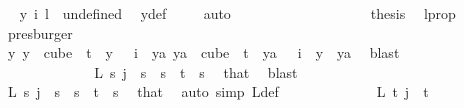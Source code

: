 \begin{isabellebody}
\ \isamarkupfalse%
\ {\isachardoublequoteopen}y\ i\ l\ {\isacharequal}{\kern0pt}\ undefined{\isachardoublequoteclose}\ \isamarkupfalse%
\ y{\isacharunderscore}{\kern0pt}def\ \isamarkupfalse%
\ {}\ \isamarkupfalse%
\ auto\isanewline
\ \ \ \ \ \ \ \ \ \ \ \ \ \ \ \ \isamarkupfalse%
\ \isamarkupfalse%
\ {\isacharquery}{\kern0pt}thesis\ \isamarkupfalse%
\ l{\isacharunderscore}{\kern0pt}prop\ \isamarkupfalse%
\ presburger\isanewline
\ \ \ \ \ \ \ \ \ \ \ \ \ \ \isamarkupfalse%
\isanewline
\ \ \ \ \ \ \ \ \ \ \ \ \isamarkupfalse%
\isanewline
\ \ \ \ \ \ \ \ \ \ \ \ \isamarkupfalse%
\ \isamarkupfalse%
\ {\isachardoublequoteopen}{\isasymexists}y{\isachardot}{\kern0pt}\ {\isacharparenleft}{\kern0pt}y\ {\isasymin}\ cube\ {}\ t\ {\isasymand}\ y\ {}\ {\isacharequal}{\kern0pt}\ i{\isacharparenright}{\kern0pt}\ {\isasymand}\ {\isacharparenleft}{\kern0pt}{\isasymforall}ya{\isachardot}{\kern0pt}\ ya\ {\isasymin}\ cube\ {}\ t\ {\isasymand}\ ya\ {}\ {\isacharequal}{\kern0pt}\ i\ {\isasymlongrightarrow}\ y\ {\isacharequal}{\kern0pt}\ ya{\isacharparenright}{\kern0pt}{\isachardoublequoteclose}\ \isamarkupfalse%
\ blast\isanewline
\isanewline
\ \ \ \ \ \ \ \ \ \ \isamarkupfalse%
\isanewline
\ \ \ \ \ \ \ \ \ \ \isamarkupfalse%
\ \isamarkupfalse%
\ {\isachardoublequoteopen}L\ s\ j\ {\isacharequal}{\kern0pt}\ s{\isachardoublequoteclose}\ \ {\isachardoublequoteopen}s\ {\isacharless}{\kern0pt}\ t{\isachardoublequoteclose}\ \ s\ \isamarkupfalse%
\ that\ \isamarkupfalse%
\ blast\isanewline
\ \ \ \ \ \ \ \ \ \ \isamarkupfalse%
\ \isamarkupfalse%
\ {\isachardoublequoteopen}L{\isacharprime}{\kern0pt}\ s\ j\ {\isacharequal}{\kern0pt}\ s{\isachardoublequoteclose}\ \ {\isachardoublequoteopen}s\ {\isacharless}{\kern0pt}\ t{\isachardoublequoteclose}\ \ s\ \isamarkupfalse%
\ that\ \isamarkupfalse%
\ {\isacharparenleft}{\kern0pt}auto\ simp{\isacharcolon}{\kern0pt}\ L{\isacharprime}{\kern0pt}{\isacharunderscore}{\kern0pt}def{\isacharparenright}{\kern0pt}\isanewline
\ \ \ \ \ \ \ \ \ \ \isamarkupfalse%
\ \isamarkupfalse%
\ {\isachardoublequoteopen}L{\isacharprime}{\kern0pt}\ t\ j\ {\isacharequal}{\kern0pt}\ t{\isachardoublequoteclose}\ \isamarkupfalse%

\end{isabellebody}
